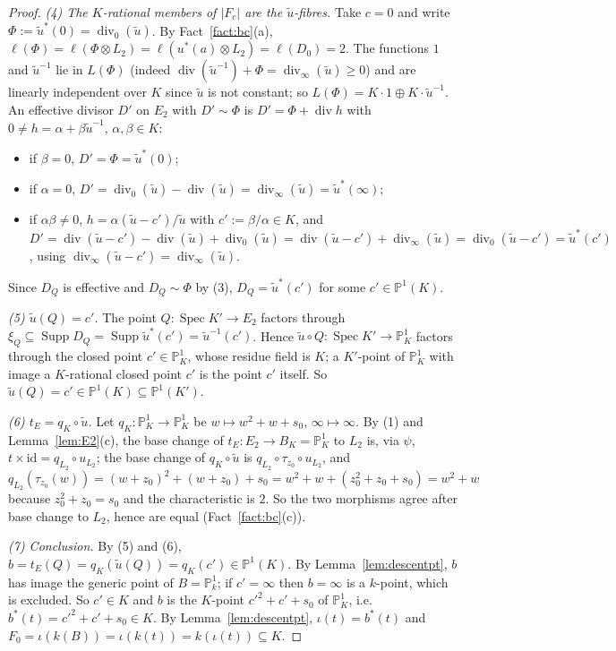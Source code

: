 \documentclass[11pt]{amsart}
\theoremstyle{definition}
\theoremstyle{remark}
\newcommand{\PP}{\mathbb P}
\newcommand{\Spec}{\operatorname{Spec}}
\newcommand{\Supp}{\operatorname{Supp}}
\newcommand{\divv}{\operatorname{div}}
\newcommand{\ut}{\tilde u}
\begin{document}
\begin{proof}
\emph{(4) The $K$-rational members of $|F_c|$ are the $\ut$-fibres.} Take $c=0$ and write
$\Phi:=\ut^*(0)=\divv_0(\ut)$. By
Fact~\ref{fact:bc}(a), $\ell(\Phi)=\ell(\Phi\otimes L_2)=\ell(u^*(a)\otimes L_2)=\ell(D_0)=2$.
The functions $1$ and $\ut^{-1}$ lie in $L(\Phi)$ (indeed $\divv(\ut^{-1})+\Phi=\divv_\infty(\ut)\ge0$)
and are linearly independent over $K$ since $\ut$ is not constant; so
$L(\Phi)=K\cdot1\oplus K\cdot\ut^{-1}$. An effective divisor $D'$ on $E_2$ with $D'\sim\Phi$
is $D'=\Phi+\divv h$ with $0\ne h=\alpha+\beta\ut^{-1}$, $\alpha,\beta\in K$:
\begin{itemize}
\item if $\beta=0$, $D'=\Phi=\ut^*(0)$;
\item if $\alpha=0$, $D'=\divv_0(\ut)-\divv(\ut)=\divv_\infty(\ut)=\ut^*(\infty)$;
\item if $\alpha\beta\ne0$, $h=\alpha(\ut-c')/\ut$ with $c':=\beta/\alpha\in K$, and
$D'=\divv(\ut-c')-\divv(\ut)+\divv_0(\ut)=\divv(\ut-c')+\divv_\infty(\ut)=\divv_0(\ut-c')=\ut^*(c')$,
using $\divv_\infty(\ut-c')=\divv_\infty(\ut)$.
\end{itemize}
Since $D_Q$ is effective and $D_Q\sim\Phi$ by (3), $D_Q=\ut^*(c')$ for some $c'\in\PP^1(K)$.

\emph{(5) $\ut(Q)=c'$.} The point $Q\colon\Spec K'\to E_2$ factors through
$\xi_Q\subseteq\Supp D_Q=\Supp\ut^*(c')=\ut^{-1}(c')$. Hence $\ut\circ Q\colon\Spec K'\to\PP^1_K$
factors through the closed point $c'\in\PP^1_K$, whose residue field is $K$; a
$K'$-point of $\PP^1_K$ with image a $K$-rational closed point $c'$ is the point $c'$
itself. So $\ut(Q)=c'\in\PP^1(K)\subseteq\PP^1(K')$.

\emph{(6) $t_E=q_K\circ\ut$.} Let $q_K\colon\PP^1_K\to\PP^1_K$ be $w\mapsto w^2+w+s_0$,
$\infty\mapsto\infty$. By (1) and Lemma~\ref{lem:E2}(c), the base change of
$t_E\colon E_2\to B_K=\PP^1_K$ to $L_2$ is, via $\psi$, $t\times\mathrm{id}=q_{L_2}\circ u_{L_2}$;
the base change of $q_K\circ\ut$ is $q_{L_2}\circ\tau_{z_0}\circ u_{L_2}$, and
\[
q_{L_2}(\tau_{z_0}(w))=(w+z_0)^2+(w+z_0)+s_0=w^2+w+(z_0^2+z_0+s_0)=w^2+w
\]
because $z_0^2+z_0=s_0$ and the characteristic is $2$. So the two morphisms agree after
base change to $L_2$, hence are equal (Fact~\ref{fact:bc}(c)).

\emph{(7) Conclusion.} By (5) and (6), $b=t_E(Q)=q_K(\ut(Q))=q_K(c')\in\PP^1(K)$. By
Lemma~\ref{lem:descentpt}, $b$ has image the generic point of $B=\PP^1_k$; if $c'=\infty$
then $b=\infty$ is a $k$-point, which is excluded. So $c'\in K$ and $b$ is the $K$-point
$c'^2+c'+s_0$ of $\PP^1_K$, i.e.\ $b^*(t)=c'^2+c'+s_0\in K$. By Lemma~\ref{lem:descentpt},
$\iota(t)=b^*(t)$ and $F_0=\iota(k(B))=\iota(k(t))=k(\iota(t))\subseteq K$.
\end{proof}
\end{document}
